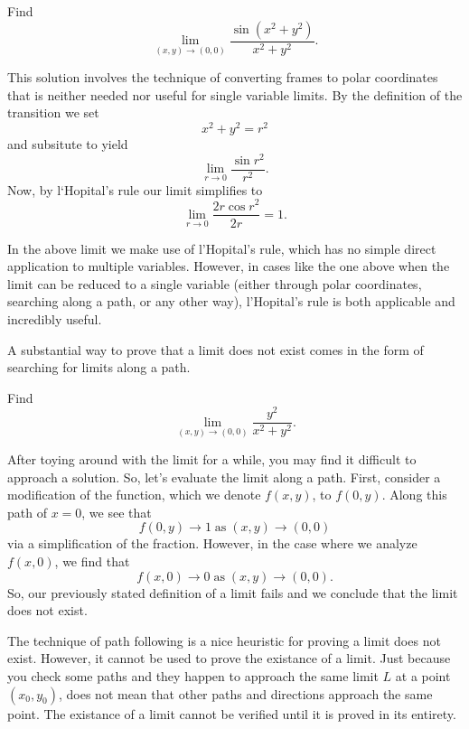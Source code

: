 \begin{example}
    Find
    \[\lim_{(x, y) \to (0, 0)} \frac{\sin\left(x^{2} + y^{2}\right)}{x^{2} + y^{2}}.\]

    \begin{soln}
        This solution involves the technique of converting frames to polar coordinates that is neither needed nor useful for single variable limits. By the definition of the transition we set
        \[x^{2} + y^{2} = r^{2}\]
        and subsitute to yield
        \[\lim_{r \to 0} \frac{\sin r^{2}}{r^{2}}.\]
        Now, by l`Hopital's rule our limit simplifies to
        \[\lim_{r \to 0} \frac{2r \cos r^{2}}{2r} = 1.\]
    \end{soln}
\end{example}

\begin{remark}
    In the above limit we make use of l'Hopital's rule, which has no simple direct application to multiple variables. However, in cases like the one above when the limit can be reduced to a single variable (either through polar coordinates, searching along a path, or any other way), l'Hopital's rule is both applicable and incredibly useful.
\end{remark}

A substantial way to prove that a limit does not exist comes in the form of searching for limits along a path.

\begin{example}
    Find
    \[\lim_{(x, y) \to (0, 0)} \frac{y^{2}}{x^{2} + y^{2}}.\]

    \begin{soln}
        After toying around with the limit for a while, you may find it difficult to approach a solution. So, let's evaluate the limit along a path. First, consider a modification of the function, which we denote $f(x, y)$, to $f(0, y)$. Along this path of $x = 0$, we see that
        \[f(0, y) \to 1 \; \text{as} \; (x, y) \to (0, 0)\]
        via a simplification of the fraction. However, in the case where we analyze $f(x, 0)$, we find that
        \[f(x, 0) \to 0 \; \text{as} \; (x, y) \to (0, 0).\]
        So, our previously stated definition of a limit fails and we conclude that the limit does not exist.
    \end{soln}
\end{example}

\begin{remark}
    The technique of path following is a nice heuristic for proving a limit does not exist. However, it cannot be used to prove the existance of a limit. Just because you check some paths and they happen to approach the same limit $L$ at a point $(x_{0}, y_{0})$, does not mean that other paths and directions approach the same point. The existance of a limit cannot be verified until it is proved in its entirety.
\end{remark}